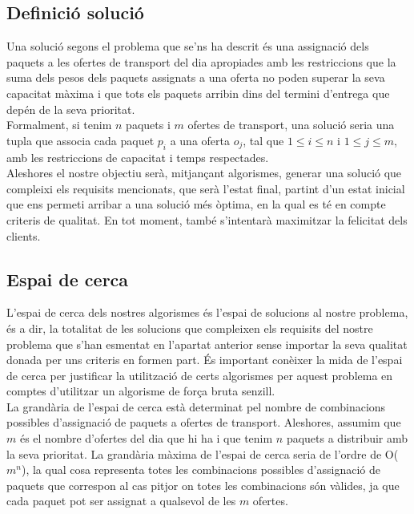 \documentclass[a4paper]{article}
\begin{document}
	\subsection{Definició solució}

	Una solució segons el problema que se'ns ha descrit és una assignació dels paquets a les ofertes de transport del dia apropiades amb les restriccions que la suma dels pesos dels paquets assignats a una oferta no poden superar la seva capacitat màxima i que tots els paquets arribin dins del termini d'entrega que depén de la seva prioritat. \\

	Formalment, si tenim $n$ paquets i $m$ ofertes de transport, una solució seria una tupla que associa cada paquet $p_i$ a una oferta $o_j$, tal que $1 \leq i \leq n$ i $1 \leq j \leq m$, amb les restriccions de capacitat i temps respectades. \\

	Aleshores el nostre objectiu serà, mitjançant algorismes, generar una solució que compleixi els requisits mencionats, que serà l'estat final, partint d'un estat inicial que ens permeti arribar a una solució més òptima, en la qual es té en compte criteris de qualitat. En tot moment, també s'intentarà maximitzar la felicitat dels clients. \\

	\subsection{Espai de cerca}

	L'espai de cerca dels nostres algorismes és l'espai de solucions al nostre problema, és a dir, la totalitat de les solucions que compleixen els requisits del nostre problema que s'han esmentat en l'apartat anterior sense importar la seva qualitat donada per uns criteris en formen part. És important conèixer la mida de l'espai de cerca per justificar la utilització de certs algorismes per aquest problema en comptes d'utilitzar un algorisme de força bruta senzill. \\

	La grandària de l'espai de cerca està determinat pel nombre de combinacions possibles d'assignació de paquets a ofertes de transport. Aleshores, assumim que $m$ és el nombre d'ofertes del dia que hi ha i que tenim $n$ paquets a distribuir amb la seva prioritat. La grandària màxima de l'espai de cerca seria de l'ordre de O($m^n$), la qual cosa representa totes les combinacions possibles d'assignació de paquets que correspon al cas pitjor on totes les combinacions són vàlides, ja que cada paquet pot ser assignat a qualsevol de les $m$ ofertes. \\
\end{document}
